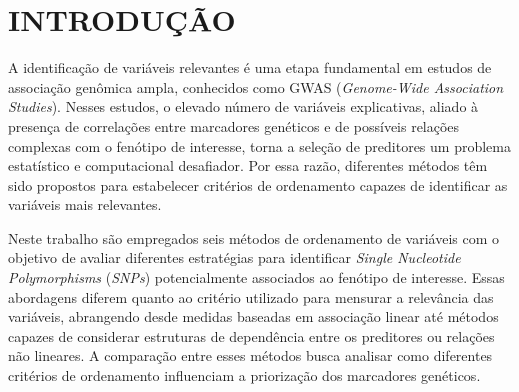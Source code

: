 \documentclass[12pt,fleqn]{article}
\renewcommand{\headrulewidth}{0pt}
\begin{document}


\renewcommand{\headrulewidth}{0pt}


\rhead{}

\pagestyle{fancy}


\section{INTRODUÇÃO}

A identificação de variáveis relevantes é uma etapa fundamental em estudos de associação genômica ampla, conhecidos como GWAS (\emph{Genome-Wide Association Studies}). Nesses estudos, o elevado número de variáveis explicativas, aliado à presença de correlações entre marcadores genéticos e de possíveis relações complexas com o fenótipo de interesse, torna a seleção de preditores um problema estatístico e computacional desafiador. Por essa razão, diferentes métodos têm sido propostos para estabelecer critérios de ordenamento capazes de identificar as variáveis mais relevantes.

Neste trabalho são empregados seis métodos de ordenamento de variáveis com o objetivo de avaliar diferentes estratégias para identificar \emph{Single Nucleotide Polymorphisms} (\emph{SNPs}) potencialmente associados ao fenótipo de interesse. Essas abordagens diferem quanto ao critério utilizado para mensurar a relevância das variáveis, abrangendo desde medidas baseadas em associação linear até métodos capazes de considerar estruturas de dependência entre os preditores ou relações não lineares. A comparação entre esses métodos busca analisar como diferentes critérios de ordenamento influenciam a priorização dos marcadores genéticos.
\end{document}
